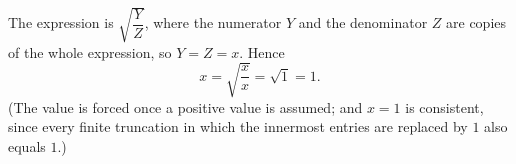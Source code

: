 The expression is $\sqrt{\dfrac{Y}{Z}}$, where the numerator $Y$ and the denominator $Z$ are copies of the whole expression, so $Y=Z=x$. Hence
\[
x=\sqrt{\dfrac {x}{x}}=\sqrt1=\boxed{1}.
\]
(The value is forced once a positive value is assumed; and $x=1$ is consistent, since every finite truncation in which the innermost entries are replaced by $1$ also equals $1$.)
